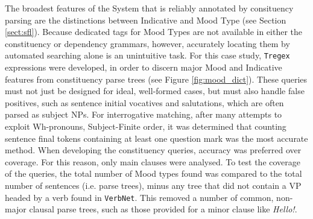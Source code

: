 The broadest features of the  System that is reliably annotated by consituency parsing are the distinctions between Indicative and Mood Type (see Section \ref{sect:sfl}). Because dedicated tags for Mood Types are not available in either the constituency or dependency grammars, however, accurately locating them by automated searching alone is an unintuitive task. For this case study, \texttt{Tregex} expressions were developed, in order to discern major Mood and Indicative features from constituency parse trees (see Figure \ref{fig:mood_dict}). These queries must not just be designed for ideal, well\hyp{}formed cases, but must also handle false positives, such as sentence initial vocatives and salutations, which are often parsed as subject NPs. For interrogative matching, after many attempts to exploit Wh\hyp{}pronouns, Subject\hyp{}Finite order, it was determined that counting sentence final tokens containing at least one question mark was the most accurate method. When developing the constituency queries, accuracy was preferred over coverage. For this reason, only main clauses were analysed. To test the coverage of the queries, the total number of Mood types found was compared to the total number of sentences (i.e. parse trees), minus any tree that did not contain a VP headed by a verb found in \texttt{VerbNet}. This removed a number of common, non\hyp{}major clausal parse trees, such as those provided for a minor clause like \emph{Hello!}.

